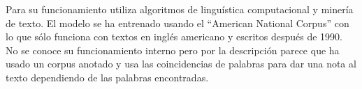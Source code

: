 Para su funcionamiento utiliza algoritmos de linguística computacional y minería de texto.
El modelo se ha entrenado usando el ``American National Corpus'' con lo que sólo funciona con 
textos en inglés americano y escritos después de 1990. 
No se conoce su funcionamiento interno pero por la descripción parece que ha usado un 
corpus anotado y usa las coincidencias de palabras para dar una nota al texto dependiendo 
de las palabras encontradas.